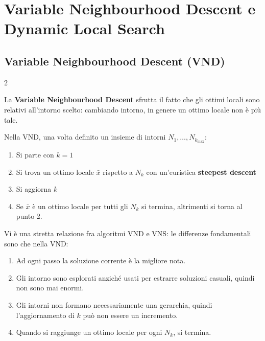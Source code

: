 \documentclass[\main/main.tex]{subfiles}
\begin{document}
\chapter{Variable Neighbourhood Descent e Dynamic Local Search}
\section{Variable Neighbourhood Descent (VND)}
\begin{multicols}{2}
\begin{observation}
    La \textbf{Variable Neighbourhood Descent} sfrutta il fatto che gli ottimi locali sono relativi all'intorno scelto: cambiando intorno, in genere un ottimo locale non è più tale.
\end{observation}
\begin{observation}
    Nella VND, una volta definito un insieme di intorni \(N_1, \ldots, N_{k_{\max}}\):
    \begin{enumerate}
        \item Si parte con \(k=1\)
        \item Si trova un ottimo locale \(\bar{x}\) rispetto a \(N_k\) con un'euristica \textbf{steepest descent}
        \item Si aggiorna \(k\)
        \item Se \(\bar{x}\) è un ottimo locale per tutti gli \(N_k\) si termina, altrimenti si torna al punto 2.
    \end{enumerate}
\end{observation}
\begin{observation}
    Vi è una stretta relazione fra algoritmi VND e VNS: le differenze fondamentali sono che nella VND:
    \begin{enumerate}
        \item Ad ogni passo la soluzione corrente è la migliore nota.
        \item Gli intorno sono esplorati anziché usati per estrarre soluzioni casuali, quindi non sono mai enormi.
        \item Gli intorni non formano necessariamente una gerarchia, quindi l'aggiornamento di \(k\) può non essere un incremento.
        \item Quando si raggiunge un ottimo locale per ogni \(N_k\), si termina.
    \end{enumerate}
\end{observation}
\begin{observation}

\end{observation}
\end{multicols}
\end{document}
